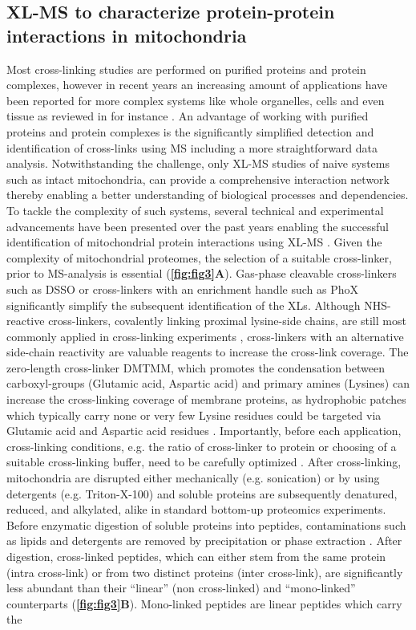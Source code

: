 \subsection*{XL-MS to characterize protein-protein interactions in mitochondria}
Most cross-linking studies are performed on purified proteins and protein complexes, however in recent years an increasing amount of applications have been reported for more complex systems like whole organelles, cells and even tissue as reviewed in for instance \cite{O'Reilly_2018}. An advantage of working with purified proteins and protein complexes is the significantly simplified detection and identification of cross-links using MS including a more straightforward data analysis. Notwithstanding the challenge, only XL-MS studies of naive systems such as intact mitochondria, can provide a comprehensive interaction network thereby enabling a better understanding of biological processes and dependencies. To tackle the complexity of such systems, several technical and experimental advancements have been presented over the past years enabling the successful identification of mitochondrial protein interactions using XL-MS \cite{Liu_2018, Ryl_2020, Schweppe_2017}.  Given the complexity of mitochondrial proteomes, the selection of a suitable cross-linker, prior to MS-analysis is essential (\textbf{\autoref{fig:fig3}A}). Gas-phase cleavable cross-linkers such as DSSO \cite{Kao_2011} or cross-linkers with an enrichment handle such as PhoX \cite{Steigenberger_2019} significantly simplify the subsequent identification of the XLs. Although NHS- reactive cross-linkers, covalently linking proximal lysine-side chains, are still most commonly applied in cross-linking experiments \cite{Steigenberger_2020}, cross-linkers with an alternative side-chain reactivity are valuable reagents to increase the cross-link coverage. The zero-length cross-linker DMTMM, which promotes the condensation between carboxyl-groups (Glutamic acid, Aspartic acid) and primary amines (Lysines) can increase the cross-linking coverage of membrane proteins, as hydrophobic patches which typically carry none or very few Lysine residues could be targeted via Glutamic acid and Aspartic acid residues \cite{Hevler_2021b}. Importantly, before each application, cross-linking conditions, e.g. the ratio of cross-linker to protein or choosing of a suitable cross-linking buffer, need to be carefully optimized \cite{O'Reilly_2018}. After cross-linking, mitochondria are disrupted either mechanically (e.g. sonication) or by using detergents (e.g. Triton-X-100) and soluble proteins are subsequently denatured, reduced, and alkylated, alike in standard bottom-up proteomics experiments. Before enzymatic digestion of soluble proteins into peptides, contaminations such as lipids and detergents are removed by precipitation or phase extraction \cite{Klykov_2018}. After digestion, cross-linked peptides, which can either stem from the same protein (intra cross-link) or from two distinct proteins (inter cross-link), are significantly less abundant than their “linear” (non cross-linked) and “mono-linked” counterparts \cite{Leitner_2014, Leitner_2010, Sinnott_2020} (\textbf{\autoref{fig:fig3}B}). Mono-linked peptides are linear peptides which carry the 